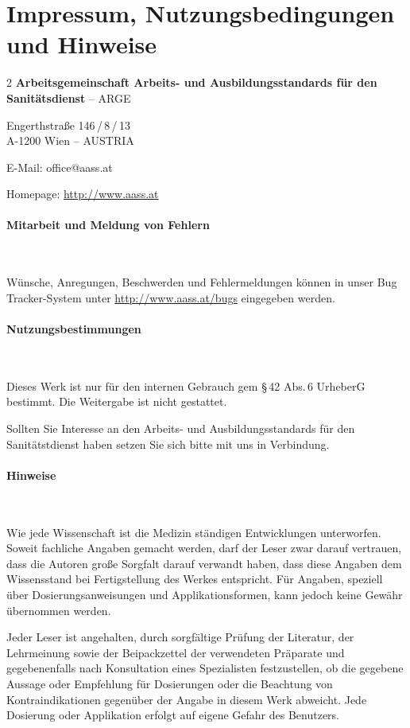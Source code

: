 \documentclass[ngerman,a4paper,fontsize=9pt,BCOR=1.5cm,headings=big,draft=no]{scrbook}
\begin{document}
\section*{Impressum, Nutzungsbedingungen und Hinweise}
\begin{multicols}{2}
{\bfseries Arbeitsgemeinschaft Arbeits- und Ausbildungsstandards für den
Sanitätsdienst} -- {\selectfont
ARGE \AASS}

Engerthstraße 146\,/\,8\,/\,13 \\ A-1200 Wien -- AUSTRIA

E-Mail: office@aass.at

Homepage: \url{http://www.aass.at}

\paragraph*{Mitarbeit und Meldung von Fehlern}~

Wünsche, Anregungen, Beschwerden und Fehlermeldungen können
in unser Bug Tracker-System unter
\url{http://www.aass.at/bugs} eingegeben werden.

\paragraph*{Nutzungsbestimmungen}~

Dieses Werk ist nur für den internen Gebrauch gem §\,42
Abs.\,6 UrheberG bestimmt. Die Weitergabe ist nicht
gestattet. 

Sollten Sie Interesse an den Arbeits- und
Ausbildungsstandards für den Sanitätstdienst haben setzen
Sie sich bitte mit uns in Verbindung.

\begin{minipage}{\linewidth}
\paragraph*{Hinweise}~

Wie jede Wissenschaft ist die Medizin ständigen Ent\-wicklungen
unterworfen. Soweit fachliche Angaben ge\-macht werden, darf der Leser
zwar darauf ver\-trau\-en, dass die Autoren gro{\ss}e Sorg\-falt
da\-rauf verwandt haben, dass diese An\-ga\-ben dem Wissens\-stand bei
Ferti\-gstel\-lung des Werkes entspricht. Für Angaben, spe\-ziell
über Dosierungsanweisungen und Ap\-plikations\-formen, kann jedoch
keine Ge\-währ übernommen werden. 
\end{minipage}

Jeder Leser ist angehalten, durch
sorg\-fältige Prü\-fung der Literatur, der Lehrmeinung so\-wie der
Beipackzettel der ver\-wendeten Präparate und gegebenenfalls nach
Konsultation eines Spezialisten fest\-zustellen, ob die gegebene
Aussage oder Empfehlung für Do\-sierungen oder die Beachtung von
Kon\-tra\-indi\-ka\-tionen gegenüber der Angabe in diesem
Werk abweicht. Jede Dosierung oder Ap\-pli\-kation erfolgt
auf eigene Gefahr des Be\-nutzers. 


\end{multicols}
\end{document}
